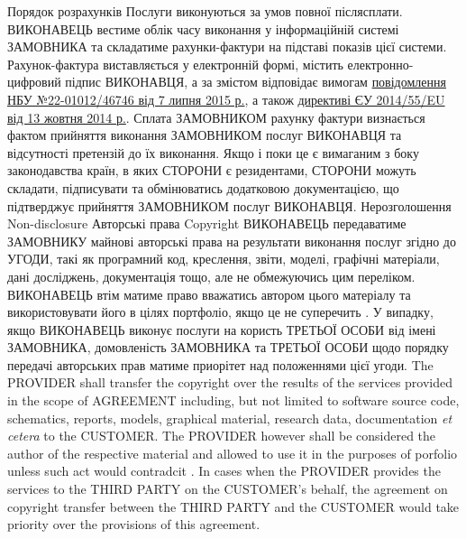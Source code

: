 \begin{Form}
\begin{paracol}{3}
        {}
      \clause %
        {Порядок розрахунків}
        {}
        {}
        {\label{sec:payment}Послуги виконуються за умов повної післясплати. ВИКОНАВЕЦЬ вестиме облік часу виконання у інформаційній системі ЗАМОВНИКА та складатиме рахунки-фактури на підставі показів цієї системи. Рахунок-фактура виставляється у електронній формі, містить електронно-цифровий підпис ВИКОНАВЦЯ, а за змістом відповідає вимогам \href{http://bank.gov.ua/doccatalog/document?id=19208488}{повідомлення НБУ №22-01012/46746 від 7 липня 2015 р.}, а також \href{http://eur-lex.europa.eu/legal-content/EN/TXT/?uri=CELEX:32014L0055}{директиві ЄУ 2014/55/EU від 13 жовтня 2014 р.}. Сплата ЗАМОВНИКОМ рахунку фактури визнається фактом прийняття виконання ЗАМОВНИКОМ послуг ВИКОНАВЦЯ та відсутності претензій до їх виконання. Якщо і поки це є вимаганим з боку законодавства країн, в яких СТОРОНИ є резидентами, СТОРОНИ можуть складати, підписувати та обмінюватись додатковою документацією, що підтверджує прийняття ЗАМОВНИКОМ послуг ВИКОНАВЦЯ.}
        {}
        {}
      \clause
        {Нерозголошення}
        {Non-disclosure}
        {}
        {\label{sec:nda}}
        {}
        {}
      \clause
        {Авторські права}
        {Copyright}
        {}
        {ВИКОНАВЕЦЬ передаватиме ЗАМОВНИКУ майнові авторські права на результати виконання послуг згідно до УГОДИ, такі як програмний код, креслення, звіти, моделі, графічні матеріали, дані досліджень, документація тощо, але не обмежуючись цим переліком. ВИКОНАВЕЦЬ втім матиме право вважатись автором цього матеріалу та використовувати його в цілях портфоліо, якщо це не суперечить . У випадку, якщо ВИКОНАВЕЦЬ виконує послуги на користь ТРЕТЬОЇ ОСОБИ від імені ЗАМОВНИКА, домовленість ЗАМОВНИКА та ТРЕТЬОЇ ОСОБИ щодо порядку передачі авторських прав матиме приорітет над положеннями цієї угоди.}
        {The PROVIDER shall transfer the copyright over the results of the services provided in the scope of AGREEMENT including, but not limited to software source code, schematics, reports, models, graphical material, research data, documentation \emph{et ce\-te\-ra} to the CUSTOMER. The PROVIDER however shall be considered the author of the respective material and allowed to use it in the purposes of porfolio unless such act would contradcit . In cases when the PROVIDER provides the services to the THIRD PARTY on the CUSTOMER's behalf, the agreement on copyright transfer between the THIRD PARTY and the CUSTOMER would take priority over the provisions of this agreement.}
        {}
    \end{paracol}
  \appendix
  
  
  
  \end{Form}

